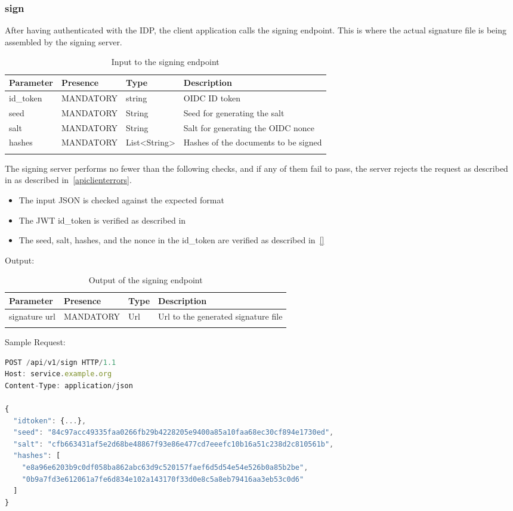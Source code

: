 \subsubsection{sign}\label{subsubsec:signrequest}
After having authenticated with the IDP, the client application calls the signing endpoint.
This is where the actual signature file is being assembled by the signing server.

\begin{longtable}{|l|l|l|l|}
	\hline
	\textbf{Parameter} & \textbf{Presence} & \textbf{Type} & \textbf{Description} \\ \hline
	id\_token & MANDATORY & string & OIDC ID token \\ \hline
	seed & MANDATORY & String & Seed for generating the salt \\ \hline
	salt & MANDATORY & String & Salt for generating the OIDC nonce \\ \hline
	hashes & MANDATORY & List<String> & Hashes of the documents to be signed \\ \hline
	\caption{Input to the signing endpoint}
\end{longtable}

The signing server performs no fewer than the following checks, and if any of them fail to pass,
the server rejects the request as described in as described in~\ref{apiclienterrors}.
\begin{itemize}
    \item The input \gls{JSON} is checked against the expected format
	\item The \gls{JWT} id\_token is verified as described in~\cite[Section~7.2]{rfc7519}
	\item The seed, salt, hashes, and the nonce in the id\_token are verified as described in~\ref{}
\end{itemize}

Output:

\begin{longtable}{|l|l|l|l|}
	\hline
	\textbf{Parameter} & \textbf{Presence} & \textbf{Type} & \textbf{Description} \\ \hline
	signature url & MANDATORY & Url & Url to the generated signature file\\ \hline
	\caption{Output of the signing endpoint}
\end{longtable}

Sample Request:
\begin{lstlisting}[caption={sign request}, captionpos=b, language=JavaScript, label={lst:signrequest}]
POST /api/v1/sign HTTP/1.1
Host: service.example.org
Content-Type: application/json

{
  "idtoken": {...},
  "seed": "84c97acc49335faa0266fb29b4228205e9400a85a10faa68ec30cf894e1730ed",
  "salt": "cfb663431af5e2d68be48867f93e86e477cd7eeefc10b16a51c238d2c810561b",
  "hashes": [
    "e8a96e6203b9c0df058ba862abc63d9c520157faef6d5d54e54e526b0a85b2be",
    "0b9a7fd3e612061a7fe6d834e102a143170f33d0e8c5a8eb79416aa3eb53c0d6"
  ]
}
\end{lstlisting}

